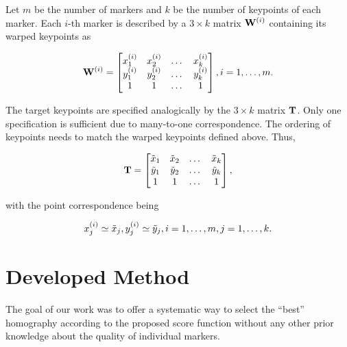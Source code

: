 Let $m$ be the number of markers and $k$ be the number of keypoints of each marker. Each $i$-th marker is described by a $3 \times k$ matrix ${\mathbf{W}}^{\left( {i} \right)}$ containing its warped keypoints as

\begin{equation}
    {\mathbf{W}}^{\left( {i} \right)} =
    \begin{bmatrix}
        {x}_{1}^{\left( {i} \right)} & {x}_{2}^{\left( {i} \right)} & \dots & {x}_{k}^{\left( {i} \right)}\\
        {y}_{1}^{\left( {i} \right)} & {y}_{2}^{\left( {i} \right)} & \dots & {y}_{k}^{\left( {i} \right)}\\
        1                         & 1                         & \dots & 1
    \end{bmatrix},
    i = 1, \dots, m.
\end{equation}

\noindent The target keypoints are specified analogically by the $3 \times k$ matrix $\mathbf{T}$. Only one specification is sufficient due to many-to-one correspondence. The ordering of keypoints needs to match the warped keypoints defined above. Thus,

\begin{equation}
    \mathbf{T} =
    \begin{bmatrix}
        \tilde{x}_1 & \tilde{x}_2 & \dots & \tilde{x}_k\\
        \tilde{y}_1 & \tilde{y}_2 & \dots & \tilde{y}_k\\
        1           & 1           & \dots & 1
    \end{bmatrix},
\end{equation}

\noindent with the point correspondence being

\begin{equation}
    {x}_{j}^{\left( {i} \right)} \simeq \tilde{x}_j, {y}_{j}^{\left( {i} \right)} \simeq \tilde{y}_j, i = 1, \dots, m, j = 1, \dots, k.
\end{equation}

\section{Developed Method}
\label{sec:HomographyDevelopedMethod}

The goal of our work was to offer a systematic way to select the ``best'' homography according to the proposed score function without any other prior knowledge about the quality of individual markers.

